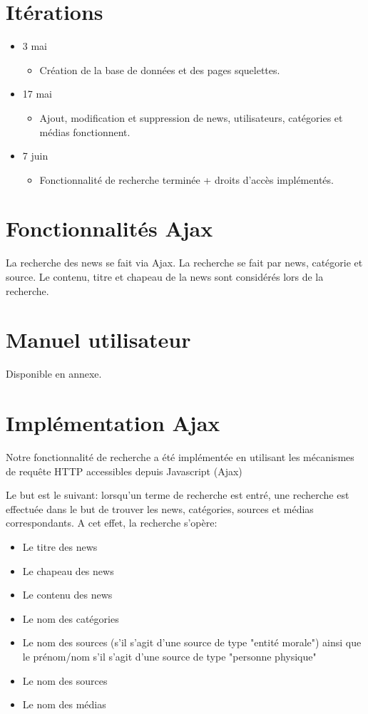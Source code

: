 \documentclass{article}
\begin{document}
\section{Itérations}

\begin{itemize}
\item 3 mai
	\begin{itemize}
	\item Création de la base de données et des pages squelettes.
	\end{itemize}
	
\item 17 mai
	\begin{itemize}
	\item Ajout, modification et suppression de news, utilisateurs, catégories et médias fonctionnent.
	\end{itemize}

\item 7 juin
	\begin{itemize}
	\item Fonctionnalité de recherche terminée + droits d'accès implémentés.
	\end{itemize}
\end{itemize}

\section{Fonctionnalités Ajax}

La recherche des news se fait via Ajax. La recherche se fait par news, catégorie et source. Le contenu, titre et chapeau de la news sont considérés lors de la recherche.

\section{Manuel utilisateur}

Disponible en annexe.

\section{Implémentation Ajax}

Notre fonctionnalité de recherche a été implémentée en utilisant les mécanismes de requête HTTP accessibles depuis Javascript (Ajax)

Le but est le suivant: lorsqu'un terme de recherche est entré, une recherche est effectuée dans le but de trouver les news, catégories, sources et médias correspondants.
A cet effet, la recherche s'opère:
\begin{itemize}
\item Le titre des news
\item Le chapeau des news
\item Le contenu des news
\item Le nom des catégories
\item Le nom des sources (s'il s'agit d'une source de type "entité morale") ainsi que le prénom/nom s'il s'agit d'une source de type "personne physique"
\item Le nom des sources
\item Le nom des médias
\end{itemize}
\end{document}
